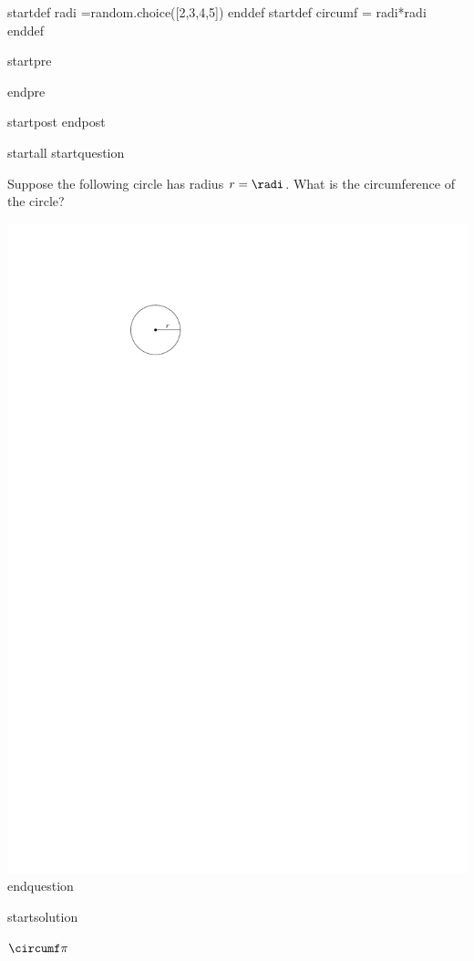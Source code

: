 startdef radi =random.choice([2,3,4,5]) enddef 
startdef circumf = radi*radi enddef


startpre

endpre



startpost
\vspace{1cm}
endpost


startall
startquestion 
\item Suppose the following circle has radius $r= \radi$. What is the circumference of the circle?
\vspace{2mm}

\includegraphics[scale = 0.8]{circle}
endquestion 


startsolution
\item $\circumf \pi$

